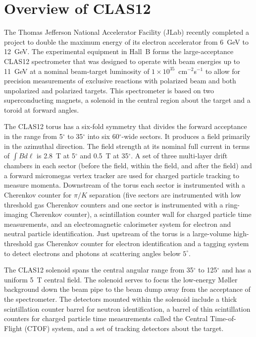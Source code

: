 \documentclass{elsart}
\begin{document}

\newpage
\section{Overview of CLAS12}

The Thomas Jefferson National Accelerator Facility (JLab) recently completed a project to 
double the maximum energy of its electron accelerator from 6~GeV to 12~GeV. The experimental 
equipment in Hall~B forms the large-acceptance CLAS12 spectrometer that was designed to operate 
with beam energies up to 11~GeV at a nominal beam-target luminosity of 
$1 \times 10^{35}$~cm$^{-2}$s$^{-1}$ to allow for precision measurements of exclusive 
reactions with polarized beam and both unpolarized and polarized targets. This spectrometer is 
based on two superconducting magnets, a solenoid in the central region about the target and a 
toroid at forward angles.

The CLAS12 torus has a six-fold symmetry that divides the forward acceptance in the range from
5$^\circ$ to 35$^\circ$ into six 60$^\circ$-wide sectors. It produces a field primarily in the 
azimuthal direction. The field strength at its nominal full current in terms of 
$\int \!B d\ell$ is 2.8~T at 5$^\circ$ and 0.5~T at 35$^\circ$. A set of three multi-layer drift 
chambers in each sector (before the field, within the field, and after the field) and a forward
micromegas vertex tracker are used for charged particle tracking to measure momenta. Downstream 
of the torus each sector is instrumented with a Cherenkov counter for $\pi/K$ separation (five 
sectors are instrumented with low threshold gas Cherenkov counters and one sector is instrumented 
with a ring-imaging Cherenkov counter), a scintillation counter wall for charged particle 
time measurements, and an electromagnetic calorimeter system for electron and neutral particle 
identification. Just upstream of the torus is a large-volume high-threshold gas Cherenkov counter 
for electron identification and a tagging system to detect electrons and photons at scattering 
angles below $5^\circ$.

The CLAS12 solenoid spans the central angular range from 35$^\circ$ to 125$^\circ$ and has a 
uniform 5~T central field. The solenoid serves to focus the low-energy M{\o}ller background down 
the beam pipe to the beam dump away from the acceptance of the spectrometer. The detectors
mounted within the solenoid include a thick scintillation counter barrel for neutron identification, a
barrel of thin scintillation counters for charged particle time measurements called the Central 
Time-of-Flight (CTOF) system, and a set of tracking detectors about the target.
\end{document}
